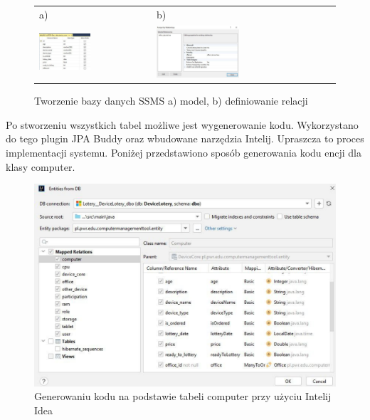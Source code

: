\begin{figure}[htb]
  \centering
	\begin{tabular}{@{}ll@{}}
	a) & b) \\
  \includegraphics[width=0.475\textwidth]{rys04/design.pdf} & 
	\includegraphics[width=0.475\textwidth]{rys04/relation.pdf}
	\end{tabular}
  \caption{Tworzenie bazy danych SSMS a) model, b) definiowanie relacji}
  \label{ssms_tworzenie:label}
\end{figure}

Po stworzeniu wszystkich tabel możliwe jest wygenerowanie kodu. Wykorzystano do tego plugin JPA Buddy oraz wbudowane narzędzia Intelij. Upraszcza to proces implementacji systemu. Poniżej przedstawiono sposób generowania kodu encji dla klasy computer.

\begin{figure}[h]
		\centering
    \includegraphics[width=0.7\linewidth]{rys04/generate.pdf}
    \caption{Generowaniu kodu na podstawie tabeli computer przy użyciu Intelij Idea}
    \label{generate:label}
\end{figure}

